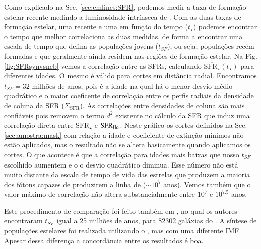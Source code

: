 Como explicado na Sec. \ref{sec:emlines:SFR}, podemos medir a taxa de formação estelar recente
medindo a luminosidade intrínseca de \Halpha. Com as duas taxas de formação estelar, uma recente e
uma em função do tempo ($t_\star$) podemos encontrar o tempo que melhor correlaciona as duas
medidas, de forma a encontrar uma escala de tempo que defina as populações jovens ($t_{SF}$), ou
seja, populações recém formadas e que geralmente ainda residem nas regiões de formação estelar. Na
Fig. \ref{fig:SFRsynvsneb} vemos a correlação entre as SFRs, calculando
$\overline{\mathrm{SFR}_\star}(t_\star)$ para diferentes idades. O mesmo é válido para cortes em
distância radial. Encontramos $t_{SF} = 32$ milhões de anos, pois é a idade na qual há o menor
desvio médio quadrático e o maior coeficente de correlação entre os perfis radiais da densidade de
coluna da SFR ($\Sigma_{\mathrm{SFR}}$). As correlações entre densidades de coluna são mais
confiáveis pois removem o termo $d^2$ existente no cálculo da SFR que induz uma correlação direta entre
$\mathrm{SFR}_\star$ e $\mathrm{SFR}_{\Halpha}$. Neste gráfico os cortes definidos na Sec.
\ref{sec:amostra:mask} com relação a idade e coeficiente de extinção mínimos não estão aplicados,
mas o resultado não se altera basicamente quando aplicamos os cortes. O que acontece é que a
correlação para idades mais baixas que nosso $t_{SF}$ escolhido aumentem e o o desvio quadrático
diminua. Esse número não está muito distante da escala de tempo de vida das estrelas que produzem a
maioria dos fótons capazes de produzirem a linha de \Halpha ($\sim10^7$ anos). Vemos também que o
valor máximo de correlação não altera substancialmente entre $10^7$ e $10^{7.5}$ anos.

Este procedimento de comparação foi feito também em \citet{Asari.etal.2007a}, no qual os autores
encontraram $t_{SF}$ igual a 25 milhões de anos, para 82302 galáxias do \SDSS. A síntese de
populações estelares foi realizada utilizando o \starlight, mas com uma diferente IMF. Apesar dessa
diferença a concordância entre os resultados é boa.

